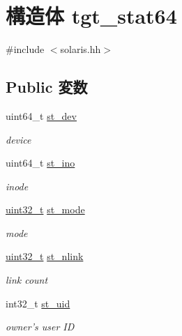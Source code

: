 \hypertarget{structSolaris_1_1tgt__stat64}{
\section{構造体 tgt\_\-stat64}
\label{structSolaris_1_1tgt__stat64}
}


{\ttfamily \#include $<$solaris.hh$>$}\subsection*{Public 変数}
\begin{DoxyCompactItemize}
\item 
uint64\_\-t \hyperlink{structSolaris_1_1tgt__stat64_a0146849d3da5c91d9776888b14b82dcc}{st\_\-dev}
\begin{DoxyCompactList}\small\item\em device \item\end{DoxyCompactList}\item 
uint64\_\-t \hyperlink{structSolaris_1_1tgt__stat64_abb54f0e7d91659ba9f4ab77a5392c08a}{st\_\-ino}
\begin{DoxyCompactList}\small\item\em inode \item\end{DoxyCompactList}\item 
\hyperlink{Type_8hh_a435d1572bf3f880d55459d9805097f62}{uint32\_\-t} \hyperlink{structSolaris_1_1tgt__stat64_a75f55d064ed3b380b0315de36e178885}{st\_\-mode}
\begin{DoxyCompactList}\small\item\em mode \item\end{DoxyCompactList}\item 
\hyperlink{Type_8hh_a435d1572bf3f880d55459d9805097f62}{uint32\_\-t} \hyperlink{structSolaris_1_1tgt__stat64_ab77c257c135fa586e930ef0bf0977c08}{st\_\-nlink}
\begin{DoxyCompactList}\small\item\em link count \item\end{DoxyCompactList}\item 
int32\_\-t \hyperlink{structSolaris_1_1tgt__stat64_a3bb3835f9991cdc69a5cea7ca39fbaaa}{st\_\-uid}
\begin{DoxyCompactList}\small\item\em owner's user ID \item\end{DoxyCompactList}\item 

\end{DoxyCompactItemize}
